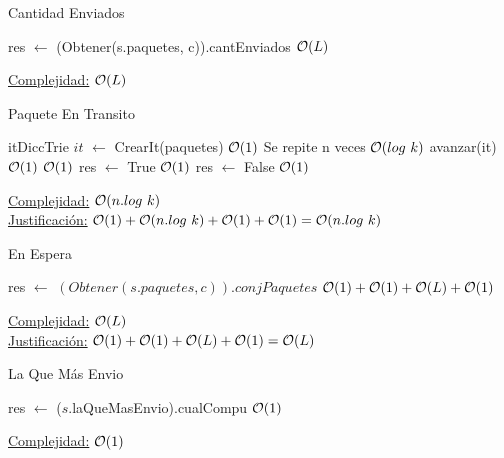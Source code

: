 \begin{Algoritmos}
\begin{algorithm}
\caption{Cantidad Enviados}
\begin{algorithmic}[1]
   \State res $\gets$ (Obtener(s.paquetes, c)).cantEnviados \Comment $\mathcal{O}(L)$
  \EndProcedure
\end{algorithmic}
\underline{Complejidad:} $\mathcal{O}(L)$
\end{algorithm}


\begin{algorithm}
\caption{Paquete En Transito}
\begin{algorithmic}[1]
   \State itDiccTrie $it$ $\gets$ CrearIt(paquetes) \Comment $\mathcal{O}(1)$
    \Comment Se repite n veces $\mathcal{O}(log \ k)$ 
   \State avanzar(it) \Comment $\mathcal{O}(1)$
	\EndWhile  
	 \Comment $\mathcal{O}(1)$
	\State res $\gets$   True \Comment $\mathcal{O}(1)$
	\Else  
	\State res $\gets$ False \Comment $\mathcal{O}(1)$
	\EndIf 
  \EndProcedure
\end{algorithmic}
 \underline{Complejidad:} $\Ogr(n.log \ k)$\\
 \underline{Justificación:} $\mathcal{O}(1)+\mathcal{O}(n.log \ k )+\mathcal{O}(1)+\mathcal{O}(1) = \mathcal{O}(n.log \ k)$
\end{algorithm}

\begin{algorithm}
\caption{En Espera}
\begin{algorithmic}[1]
    \State res $\gets$ $(Obtener(s.paquetes,c)).conjPaquetes$ \Comment $\mathcal{O}(1)+\mathcal{O}(1)+\mathcal{O}(L)+\mathcal{O}(1)$
  \EndProcedure
\end{algorithmic}
 \underline{Complejidad:} $\mathcal{O}(L)$\\
 \underline{Justificación:} $\mathcal{O}(1)+\mathcal{O}(1)+\mathcal{O}(L)+\mathcal{O}(1) = \mathcal{O}(L)$
\end{algorithm}


\begin{algorithm}
\caption{La Que Más Envio}
\begin{algorithmic}[1]
   \State res $\gets$   ($s$.laQueMasEnvio).cualCompu \Comment $\mathcal{O}(1)$
  \EndProcedure
\end{algorithmic}
  \underline{Complejidad:} $\mathcal{O}(1)$
\end{algorithm}



\end{Algoritmos}

